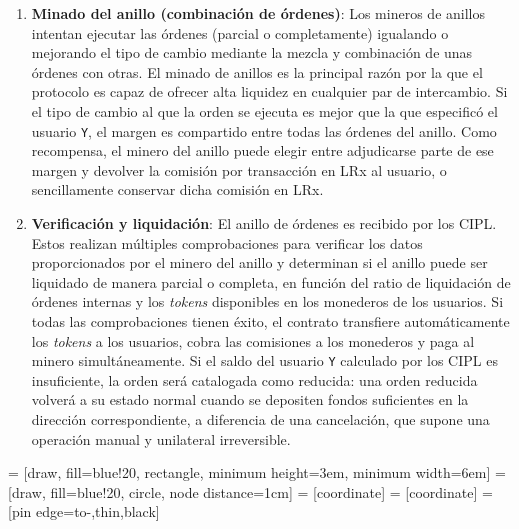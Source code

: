\documentclass[UTF8,nofonts]{article}
\makeatletter
\newenvironment{figurehere}
 {\def\@captype{figure}}
 {}
\makeatother
\begin{document}
\begin{multicols}{2}
\begin{enumerate}
\item \textbf{Minado del anillo (combinación de órdenes)}: Los mineros de anillos intentan ejecutar las órdenes (parcial o completamente) igualando o mejorando el tipo de cambio mediante la mezcla y combinación de unas órdenes con otras. El minado de anillos es la principal razón por la que el protocolo es capaz de ofrecer alta liquidez en cualquier par de intercambio. Si el tipo de cambio al que la orden se ejecuta es mejor que la que especificó el usuario \verb|Y|, el margen es compartido entre todas las órdenes del anillo. Como recompensa, el minero del anillo puede elegir entre adjudicarse parte de ese margen y devolver la comisión por transacción en LRx al usuario, o sencillamente conservar dicha comisión en LRx.

\item \textbf{Verificación y liquidación}: El anillo de órdenes es recibido por los CIPL. Estos realizan múltiples comprobaciones para verificar los datos proporcionados por el minero del anillo y determinan si el anillo puede ser liquidado de manera parcial o completa, en función del ratio de liquidación de órdenes internas y los \textit{tokens} disponibles en los monederos de los usuarios. Si todas las comprobaciones tienen éxito, el contrato transfiere automáticamente los \textit{tokens} a los usuarios, cobra las comisiones a los monederos y paga al minero simultáneamente. Si el saldo del usuario \verb|Y| calculado por los CIPL es insuficiente, la orden será catalogada como reducida: una orden reducida volverá a su estado normal cuando se depositen fondos suficientes en la dirección correspondiente, a diferencia de una cancelación, que supone una operación manual y unilateral irreversible.

\end{enumerate}

\begin{center}
\begin{figurehere}
\centering
{} = [draw, fill=blue!20, rectangle, 
    minimum height=3em, minimum width=6em]
 = [draw, fill=blue!20, circle, node distance=1cm]
 = [coordinate]
 = [coordinate]
 = [pin edge={to-,thin,black}]

\begin{tikzpicture}[
    auto, 
    scale=0.7,
    node distance=2cm,
    >=latex',
    font=\bfseries\footnotesize\sffamily,
    order/.style={
		rectangle,
		scale=0.7,
		rounded corners,
		draw=black, 
		text centered,
		minimum height=12mm,
		minimum width=30mm,
		fill=white
	},
	role/.style={
		circle,
		scale=0.7,
		draw=black, 
		text centered,
		minimum height=12mm,
		minimum width=12mm,
		fill=white
	},
	steps/.style={
		circle,
		scale=0.7,
		draw=black, 
		text centered,
		fill=black,
		text=white
	},
	account/.style={
		circle,
		scale=0.7,
		draw=black, 
		text centered,
		minimum height=16mm,
		minimum width=16mm,
		fill=white
	},
	label/.style={
	  scale=0.7
    }
  ]


\end{tikzpicture}
\end{figurehere}
\end{center}
\end{multicols}
\end{document}
